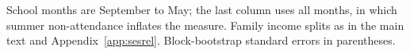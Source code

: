\documentclass[12pt]{article}
\begin{document}
\begin{table}[H]
\centering
\caption{High school dropout (not enrolled, no diploma or GED): post-event averages, 70 events, 2013--2024}
\label{tab:dropout}
\small

\begin{tablenotes}\footnotesize
\item School months are September to May; the last column uses all months, in which summer non-attendance inflates the measure. Family income splits as in the main text and Appendix~\ref{app:sesrel}. Block-bootstrap standard errors in parentheses.
\end{tablenotes}
\end{table}
\end{document}
